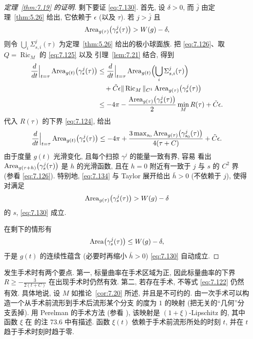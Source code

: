 \begin{proof}[定理~\ref{thm:7.19} 的证明]
剩下要证 \eqref{eq:7.130}. 首先, 设 $\delta>0$, 而 $\bar{j}$ 由定理~\ref{thm:5.26}
给出, 它依赖于 $\epsilon$ (以及 $\tau$). 若 $j>\bar{j}$ 且
\[
\operatorname{Area}_{g(\tau)}\bigl(\gamma_s^j(\tau)\bigr)>W(g)-\delta,
\]
则令 $\bigcup_i\Sigma_{s,i}^j(\tau)$ 为定理~\ref{thm:5.26} 给出的极小球面族. 把
\eqref{eq:7.126}、取 $Q=\operatorname{Ric}_M$ 的 \eqref{eq:7.125} 以及
引理~\ref{lem:7.21} 结合, 得到
\begin{equation}
\begin{aligned}
\frac{d}{dt}\Big|_{t=\tau}\operatorname{Area}_{g(t)}\bigl(\gamma_s^j(\tau)\bigr)
&\leq\frac{d}{dt}\Big|_{t=\tau}\operatorname{Area}_{g(t)}
\Bigl(\bigcup_i\Sigma_{s,i}^j(\tau)\Bigr)\\
&\quad+\tilde{C}\epsilon\|\operatorname{Ric}_M\|_{C^1}
\operatorname{Area}_{g(\tau)}\bigl(\gamma_s^j(\tau)\bigr)\\
&\leq-4\pi
-\frac{\operatorname{Area}_{g(\tau)}\bigl(\gamma_s^j(\tau)\bigr)}2\min_MR(\tau)
+\tilde{C}\epsilon.
\end{aligned}
\label{eq:7.133}
\end{equation}
代入 $R(\tau)$ 的下界 \eqref{eq:7.124}, 给出
\begin{equation}
\frac{d}{dt}\Big|_{t=\tau}\operatorname{Area}_{g(t)}\bigl(\gamma_s^j(\tau)\bigr)
\leq-4\pi
+\frac{3\max_{s_0}\operatorname{Area}_{g(\tau)}\bigl(\gamma_{s_0}^j(\tau)\bigr)}
{4(\tau+C)}+\tilde{C}\epsilon.
\label{eq:7.134}
\end{equation}
由于度量 $g(t)$ 光滑变化, 且每个扫掠 $\gamma^j$ 的能量一致有界, 容易
看出 $\operatorname{Area}_{g(\tau+h)}\bigl(\gamma_s^j(\tau)\bigr)$ 是 $h$ 的光滑函数,
且在 $h=0$ 附近有一致于 $j$ 与 $s$ 的 $C^2$ 界 (参看 \eqref{eq:7.126}).
特别地, \eqref{eq:7.134} 与 Taylor 展开给出 $\bar{h}>0$ (不依赖于 $j$),
使得对满足
\[
\operatorname{Area}_{g(\tau)}\bigl(\gamma_s^j(\tau)\bigr)>W(g)-\delta
\]
的 $s$, \eqref{eq:7.130} 成立.

在剩下的情形有
\[
\operatorname{Area}\bigl(\gamma_s^j(\tau)\bigr)\leq W(g)-\delta,
\]
于是 $g(t)$ 的连续性蕴含 (必要时再缩小 $\bar{h}>0$) \eqref{eq:7.130}
自动成立.
\end{proof}

发生手术时有两个要点. 第一, 标量曲率在手术区域为正, 因此标量曲率的下界
$R\geq-\frac3{2(t+C)}$ 在出现手术时仍然有效. 第二, 若存在手术, 不等式
\eqref{eq:7.122} 仍然有效. 具体地说, 设 $M$ 如推论~\ref{cor:7.20} 所述,
并且是不可约的. 由一次手术可以构造一个从手术前流形到手术后流形某个分支
的度为 $1$ 的映射 (把无关的``几何''分支丢掉). 用 Perelman 的手术方法
(参看 \cite{Pe2}), 该映射是 $(1+\xi)$-Lipschitz 的, 其中函数 $\xi$ 在
\cite{KL} 的注 73.6 中有描述. 函数 $\xi(t)$ 依赖于手术前流形所处的时刻
$t$, 并在 $t$ 趋于手术时刻时趋于零.
